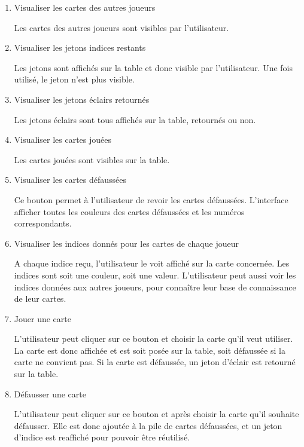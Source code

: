\documentclass{article}
\begin{document}
\begin{enumerate}

\item  {Visualiser les cartes des autres joueurs}

{\normalfont Les cartes des autres joueurs sont visibles par l’utilisateur.}

\item  {Visualiser les jetons indices restants}

{\normalfont Les jetons sont affichés sur la table et donc visible par l’utilisateur. Une fois utilisé, le jeton n'est plus visible.} 

\item  {Visualiser les jetons éclairs retournés}

{\normalfont Les jetons éclairs sont tous affichés sur la table, retournés ou non.}

\item  {Visualiser les cartes jouées}

{\normalfont Les cartes jouées sont visibles sur la table.}

\item  {Visualiser les cartes défaussées}

{\normalfont Ce bouton permet à l’utilisateur de revoir les cartes défaussées. L’interface afficher toutes les couleurs des cartes défaussées et les numéros correspondants.}

\item  {Visualiser les indices donnés pour les cartes de chaque joueur}

{\normalfont A chaque indice reçu, l’utilisateur le voit affiché sur la carte concernée. Les indices sont soit une couleur, soit une valeur. L’utilisateur peut aussi voir les indices données aux autres joueurs, pour connaître leur base de connaissance de leur cartes.}

\item  {Jouer une carte}

{\normalfont L’utilisateur peut cliquer sur ce bouton et choisir la carte qu’il veut utiliser. La carte est donc affichée et est soit posée sur la table, soit défaussée si la carte ne convient pas. Si la carte est défaussée, un jeton d’éclair est retourné sur la table.}

\item  {Défausser une carte}

{\normalfont L’utilisateur peut cliquer sur ce bouton et après choisir la carte qu’il souhaite défausser. Elle est donc ajoutée à la pile de cartes défaussées, et un jeton d’indice est reaffiché pour pouvoir être réutilisé.}


\end{enumerate}
\end{document}
